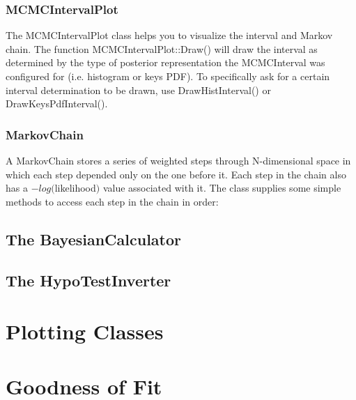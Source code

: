 \documentclass[11pt]{article}
\begin{document}
	\subsubsection{MCMCIntervalPlot}
	\label{sec:MCMCIntervalPlot}
	
	The MCMCIntervalPlot class helps you to visualize the interval and Markov chain.  The function MCMCIntervalPlot::Draw() will draw the interval as determined by the type of posterior representation the MCMCInterval was configured for (i.e. histogram or keys PDF).  To specifically ask for a certain interval determination to be drawn, use DrawHistInterval() or DrawKeysPdfInterval().
	
	
	
	\subsubsection{MarkovChain}
	\label{sec:MarkovChain}
	A MarkovChain stores a series of weighted steps through N-dimensional space in which each step depended only on the one before it.  Each step in the chain also has a $-log($likelihood$)$ value associated with it.  The class supplies some simple methods to access each step in the chain in order:
	
	
	

\subsection{The BayesianCalculator}

\subsection{The HypoTestInverter}

\section{Plotting Classes}

\section{Goodness of Fit}
\end{document}
